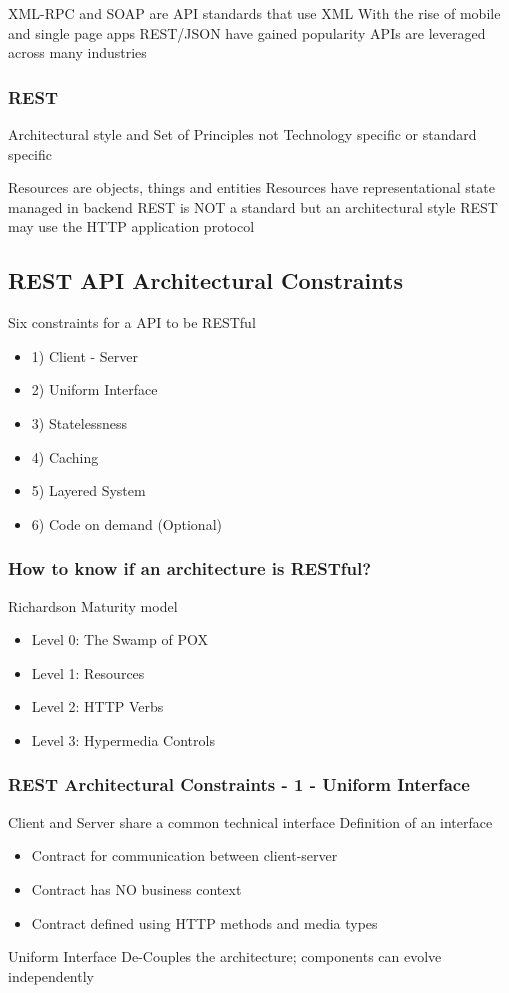 \documentclass[a4paper, 11pt]{book}
\begin{document}
    XML-RPC and SOAP are API standards that use XML
    With the rise of mobile and single page apps REST/JSON have gained popularity
    APIs are leveraged across many industries

    \subsubsection{REST}
    Architectural style and Set of Principles not Technology specific or standard specific

    Resources are objects, things and entities
    Resources have representational state managed in backend
    REST is NOT a standard but an architectural style
    REST may use the HTTP application protocol

    \subsection{REST API Architectural Constraints}
    Six constraints for a API to be RESTful
    \begin{itemize}
        \item 1) Client - Server
        \item 2) Uniform Interface
        \item 3) Statelessness
        \item 4) Caching
        \item 5) Layered System
        \item 6) Code on demand (Optional)
    \end{itemize}

    \subsubsection{How to know if an architecture is RESTful?}
    Richardson Maturity model
    \begin{itemize}
        \item Level 0: The Swamp of POX
        \item Level 1: Resources
        \item Level 2: HTTP Verbs
        \item Level 3: Hypermedia Controls
    \end{itemize}

    \subsubsection{REST Architectural Constraints - 1 - Uniform Interface}
    Client and Server share a common technical interface
    Definition of an interface
    \begin{itemize}
        \item Contract for communication between client-server
        \item Contract has NO business context
        \item Contract defined using HTTP methods and media types
    \end{itemize}
    Uniform Interface De-Couples the architecture; components can evolve independently
\end{document}
